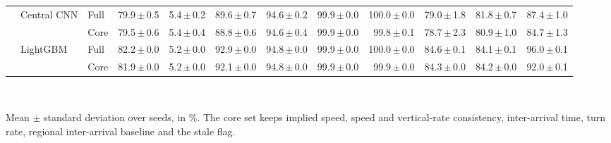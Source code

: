 \begin{table}[t]
\begin{tabular}{lllrrrrrrrrr}
 & Central CNN & Full & 79.9{\,}$\pm${\,}0.5 & 5.4{\,}$\pm${\,}0.2 & 89.6{\,}$\pm${\,}0.7 & 94.6{\,}$\pm${\,}0.2 & 99.9{\,}$\pm${\,}0.0 & 100.0{\,}$\pm${\,}0.0 & 79.0{\,}$\pm${\,}1.8 & 81.8{\,}$\pm${\,}0.7 & 87.4{\,}$\pm${\,}1.0 \\
 &  & Core & 79.5{\,}$\pm${\,}0.6 & 5.4{\,}$\pm${\,}0.4 & 88.8{\,}$\pm${\,}0.6 & 94.6{\,}$\pm${\,}0.4 & 99.9{\,}$\pm${\,}0.0 & 99.8{\,}$\pm${\,}0.1 & 78.7{\,}$\pm${\,}2.3 & 80.9{\,}$\pm${\,}1.0 & 84.7{\,}$\pm${\,}1.3 \\
 & LightGBM & Full & 82.2{\,}$\pm${\,}0.0 & 5.2{\,}$\pm${\,}0.0 & 92.9{\,}$\pm${\,}0.0 & 94.8{\,}$\pm${\,}0.0 & 99.9{\,}$\pm${\,}0.0 & 100.0{\,}$\pm${\,}0.0 & 84.6{\,}$\pm${\,}0.1 & 84.1{\,}$\pm${\,}0.1 & 96.0{\,}$\pm${\,}0.1 \\
 &  & Core & 81.9{\,}$\pm${\,}0.0 & 5.2{\,}$\pm${\,}0.0 & 92.1{\,}$\pm${\,}0.0 & 94.8{\,}$\pm${\,}0.0 & 99.9{\,}$\pm${\,}0.0 & 99.9{\,}$\pm${\,}0.0 & 84.3{\,}$\pm${\,}0.0 & 84.2{\,}$\pm${\,}0.0 & 92.0{\,}$\pm${\,}0.1 \\
\bottomrule
\end{tabular}
\\[2pt]
\parbox{\linewidth}{\scriptsize Mean $\pm$ standard deviation over  seeds, in \%. The core set keeps implied speed, speed and vertical-rate consistency, inter-arrival time, turn rate, regional inter-arrival baseline and the stale flag.}
\end{table}
